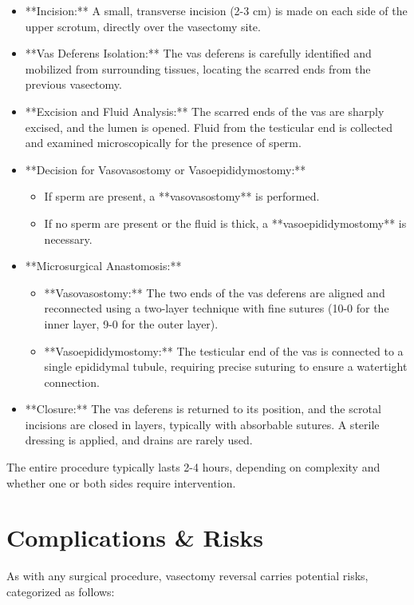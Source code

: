 \begin{itemize}
  \item **Incision:** A small, transverse incision (2-3 cm) is made on each side of the upper scrotum, directly over the vasectomy site.
  
  \item **Vas Deferens Isolation:** The vas deferens is carefully identified and mobilized from surrounding tissues, locating the scarred ends from the previous vasectomy.
  
  \item **Excision and Fluid Analysis:** The scarred ends of the vas are sharply excised, and the lumen is opened. Fluid from the testicular end is collected and examined microscopically for the presence of sperm.
  
  \item **Decision for Vasovasostomy or Vasoepididymostomy:**
    \begin{itemize}
      \item If sperm are present, a **vasovasostomy** is performed.
      \item If no sperm are present or the fluid is thick, a **vasoepididymostomy** is necessary.
    \end{itemize}
  
  \item **Microsurgical Anastomosis:**
    \begin{itemize}
      \item **Vasovasostomy:** The two ends of the vas deferens are aligned and reconnected using a two-layer technique with fine sutures (10-0 for the inner layer, 9-0 for the outer layer).
      \item **Vasoepididymostomy:** The testicular end of the vas is connected to a single epididymal tubule, requiring precise suturing to ensure a watertight connection.
    \end{itemize}
  
  \item **Closure:** The vas deferens is returned to its position, and the scrotal incisions are closed in layers, typically with absorbable sutures. A sterile dressing is applied, and drains are rarely used.
\end{itemize}

The entire procedure typically lasts 2-4 hours, depending on complexity and whether one or both sides require intervention.

\section*{Complications \& Risks}
As with any surgical procedure, vasectomy reversal carries potential risks, categorized as follows:

